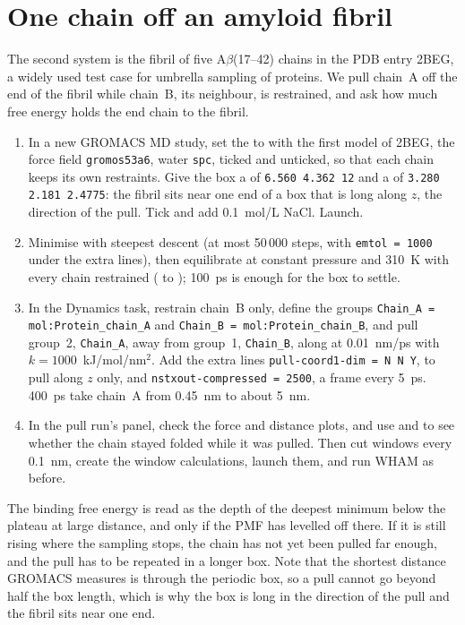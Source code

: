 \section{One chain off an amyloid fibril}
The second system is the fibril of five A$\beta$(17--42) chains in the PDB entry 2BEG, a widely used test case for umbrella sampling of proteins. We pull chain~A off the end of the fibril while chain~B, its neighbour, is restrained, and ask how much free energy holds the end chain to the fibril.
\begin{enumerate}
	\item In a new GROMACS MD study, set the  to  with the first model of 2BEG, the force field \texttt{gromos53a6}, water \texttt{spc},  ticked and  unticked, so that each chain keeps its own restraints. Give the box a  of \texttt{6.560 4.362 12} and a  of \texttt{3.280 2.181 2.4775}: the fibril sits near one end of a box that is long along $z$, the direction of the pull. Tick  and add 0.1~mol/L NaCl. Launch.
	\item Minimise with steepest descent (at most 50\,000 steps, with \texttt{emtol = 1000} under the extra lines), then equilibrate at constant pressure and 310~K with every chain restrained ( to ); 100~ps is enough for the box to settle.
	\item In the Dynamics task, restrain chain~B only, define the groups \texttt{Chain\_A = mol:Protein\_chain\_A} and \texttt{Chain\_B = mol:Protein\_chain\_B}, and pull group~2, \texttt{Chain\_A}, away from group~1, \texttt{Chain\_B}, along  at 0.01~nm/ps with $k = 1000$~kJ/mol/nm$^2$. Add the extra lines \texttt{pull-coord1-dim = N N Y}, to pull along $z$ only, and \texttt{nstxout-compressed = 2500}, a frame every 5~ps. 400~ps take chain~A from 0.45~nm to about 5~nm.
	\item In the pull run's  panel, check the force and distance plots, and use  and  to see whether the chain stayed folded while it was pulled. Then cut windows every 0.1~nm, create the window calculations, launch them, and run WHAM as before.
\end{enumerate}

The binding free energy is read as the depth of the deepest minimum below the plateau at large distance, and only if the PMF has levelled off there. If it is still rising where the sampling stops, the chain has not yet been pulled far enough, and the pull has to be repeated in a longer box. Note that the shortest distance GROMACS measures is through the periodic box, so a pull cannot go beyond half the box length, which is why the box is long in the direction of the pull and the fibril sits near one end.

